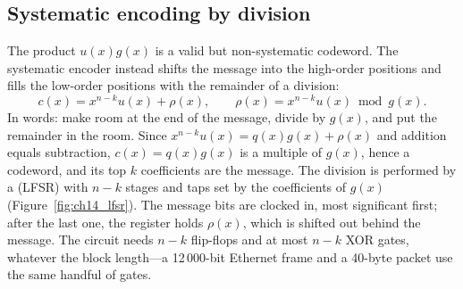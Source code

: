 \subsection{Systematic encoding by division}

The product $u(x)g(x)$ is a valid but non-systematic codeword. The systematic encoder instead
shifts the message into the high-order positions and fills the low-order positions with the
remainder of a division:
\begin{equation}
c(x)=x^{n-k}u(x)+\rho(x),\qquad \rho(x)=x^{n-k}u(x)\bmod g(x).
\label{eq:ch14:sysenc}
\end{equation}
In words: make room at the end of the message, divide by $g(x)$, and put the remainder in the room.
Since $x^{n-k}u(x)=q(x)g(x)+\rho(x)$ and addition equals subtraction, $c(x)=q(x)g(x)$ is a multiple of
$g(x)$, hence a codeword, and its top $k$ coefficients are the message. The division is performed by
a  (LFSR) with $n-k$ stages and taps set by the coefficients of
$g(x)$ (Figure~\ref{fig:ch14_lfsr}). The message bits are clocked in, most significant first; after
the last one, the register holds $\rho(x)$, which is shifted out behind the message. The circuit
needs $n-k$ flip-flops and at most $n-k$ XOR gates, whatever the block length---a 12\,000-bit
Ethernet frame and a 40-byte packet use the same handful of gates.

